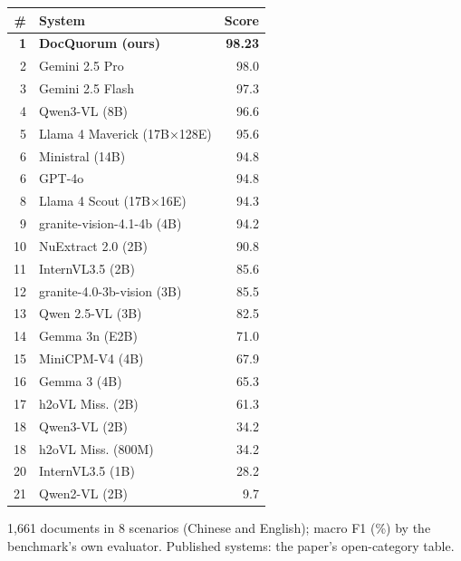 \begingroup\small\setlength{\tabcolsep}{4pt}
\begin{tabularx}{0.62\linewidth}{@{}rYr@{}}\toprule
\# & System & Score\\
\midrule
{} \textbf{1} & \textbf{DocQuorum (ours)} & \textbf{98.23}\\
2 & Gemini 2.5 Pro & 98.0\\
3 & Gemini 2.5 Flash & 97.3\\
4 & Qwen3-VL (8B) & 96.6\\
5 & Llama 4 Maverick (17B×128E) & 95.6\\
6 & Ministral (14B) & 94.8\\
6 & GPT-4o & 94.8\\
8 & Llama 4 Scout (17B×16E) & 94.3\\
9 & granite-vision-4.1-4b (4B) & 94.2\\
10 & NuExtract 2.0 (2B) & 90.8\\
11 & InternVL3.5 (2B) & 85.6\\
12 & granite-4.0-3b-vision (3B) & 85.5\\
13 & Qwen 2.5-VL (3B) & 82.5\\
14 & Gemma 3n (E2B) & 71.0\\
15 & MiniCPM-V4 (4B) & 67.9\\
16 & Gemma 3 (4B) & 65.3\\
17 & h2oVL Miss. (2B) & 61.3\\
18 & Qwen3-VL (2B) & 34.2\\
18 & h2oVL Miss. (800M) & 34.2\\
20 & InternVL3.5 (1B) & 28.2\\
21 & Qwen2-VL (2B) & 9.7\\
\bottomrule\end{tabularx}\endgroup
{}
1,661 documents in 8 scenarios (Chinese and English); macro F1 (\%) by the benchmark's own evaluator. Published systems: the paper's open-category table.

